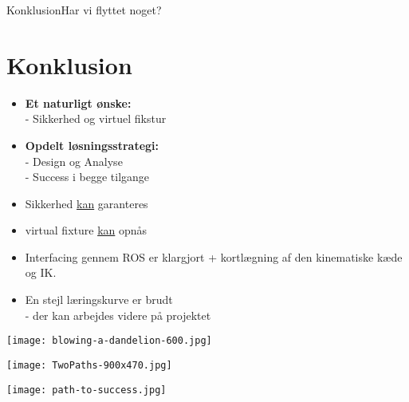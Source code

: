 \begin{frame}{Konklusion}{Har vi flyttet noget?}
\section{Konklusion}
\begin{minipage}{0.6\textwidth}
\begin{block}{}
	\begin{itemize}
		\item \textbf{Et naturligt ønske:}\\ - Sikkerhed og virtuel fikstur
		\item \textbf{Opdelt løsningsstrategi:}\\ - Design og Analyse \\
		- Success i begge tilgange 
		\vspace{0.3cm}
		\item Sikkerhed \underline{kan} garanteres
		\item virtual fixture \underline{kan} opnås
		\item \normalsize Interfacing gennem ROS er klargjort + kortlægning af den kinematiske kæde og IK.
		\item En stejl læringskurve er brudt \\ 
		\scriptsize - der kan arbejdes videre på projektet
	\end{itemize}
\end{block}
\end{minipage}
\begin{minipage}{0.35\textwidth}
\texttt{[image: blowing-a-dandelion-600.jpg]}
\vspace*{0.2cm}

\texttt{[image: TwoPaths-900x470.jpg]}
\vspace*{0.2cm}

\texttt{[image: path-to-success.jpg]}
\end{minipage}
\end{frame}

